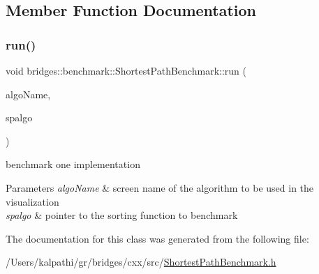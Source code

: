 \subsection{Member Function Documentation}
\mbox{\label{classbridges_1_1benchmark_1_1_shortest_path_benchmark_a012285a17bb34b443265a9962ef4d3c2}} 
\subsubsection{\texorpdfstring{run()}{run()}}
{\footnotesize\ttfamily void bridges\+::benchmark\+::\+Shortest\+Path\+Benchmark\+::run (\begin{DoxyParamCaption}\item[{std\+::string}]{algo\+Name,  }\item[{void($\ast$)(const \mbox{\hyperlink{classbridges_1_1datastructure_1_1_graph_adj_list}{Graph\+Adj\+List}}$<$ int, \mbox{\hyperlink{classbridges_1_1dataset_1_1_o_s_m_vertex}{O\+S\+M\+Vertex}}, double $>$ \&gr, int source, std\+::unordered\+\_\+map$<$ int, double $>$ \&distance, std\+::unordered\+\_\+map$<$ int, int $>$ \&parent)}]{spalgo }\end{DoxyParamCaption})\hspace{0.3cm}{\ttfamily [inline]}}



benchmark one implementation 


\begin{DoxyParams}{Parameters}
{\em algo\+Name} & screen name of the algorithm to be used in the visualization \\
\hline
{\em spalgo} & pointer to the sorting function to benchmark \\
\hline
\end{DoxyParams}


The documentation for this class was generated from the following file\+:\begin{DoxyCompactItemize}
\item 
/\+Users/kalpathi/gr/bridges/cxx/src/\mbox{\hyperlink{_shortest_path_benchmark_8h}{Shortest\+Path\+Benchmark.\+h}}\end{DoxyCompactItemize}
